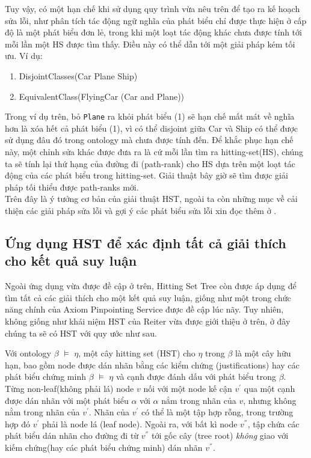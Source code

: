 		\hspace*{.05\textwidth} Tuy vậy, có một hạn chế khi sử dụng quy trình vừa nêu trên để tạo ra kế hoạch sửa lỗi, như phân tích tác động ngữ nghĩa của phát biểu chỉ được thực hiện ở cấp độ là một phát biểu đơn lẻ, trong khi một loạt tác động khác chưa được tính tới mỗi lần một HS được tìm thấy. Điều này có thể dẫn tới một giải pháp kém tối ưu. Ví dụ:
		\begin{enumerate}
			\item	DisjointClasses(Car Plane Ship)
			\item	EquivalentClass(FlyingCar (Car and Plane))			
		\end{enumerate}
		Trong ví dụ trên, bỏ \texttt{Plane} ra khỏi phát biểu (1) sẽ hạn chế mất mát về nghĩa hơn là xóa hết cả phát biểu (1), vì có thể disjoint giữa Car và Ship có thể được sử dụng đâu đó trong ontology mà chưa được tính đến.
		\hspace*{.05\textwidth} Để khắc phục hạn chế này, một chỉnh sửa khác được đưa ra là cứ mỗi lần tìm ra hitting-set(HS), chúng ta sẽ tính lại thứ hạng của đường đi (path-rank) cho HS dựa trên một loạt tác động của các phát biểu trong hitting-set. Giải thuật bây giờ sẽ tìm được giải pháp tối thiểu được path-ranks mới.
		\\
		Trên đây là ý tưởng cơ bản của giải thuật HST, ngoài ta còn những mục về cải thiện các giải pháp sửa lỗi và gợi ý các phát biểu sửa lỗi xin đọc thêm ở \cite{repair}.
		
		\subsection{Ứng dụng HST để xác định tất cả giải thích cho kết quả suy luận\cite{matt_horridge}}
		Ngoài ứng dụng vừa được đề cập ở trên, Hitting Set Tree còn được áp dụng để tìm tất cả các giải thích cho một kết quả suy luận, giống như một trong chức năng chính của Axiom Pinpointing Service được đề cập lúc nãy. Tuy nhiên, không giống như khái niệm HST của Reiter vừa được giới thiệu ở trên, ở đây chúng ta sẽ có HST với quy ước như sau.
		
		\hspace*{.05\textwidth} Với ontology $\beta$ $\models$ $\eta$, một cây hitting set (HST) cho $\eta$ trong $\beta$ là một cây hữu hạn, bao gồm node được dán nhãn bằng các kiểm chứng (justifications) hay các phát biểu chứng minh $\beta$ $\models$ $\eta$ và cạnh được đánh dấu với phát biểu trong $\beta$. Từng non-leaf(không phải lá) node $v$ nối với một node kế cận $v^{'}$ qua một cạnh được dán nhãn với một phát biểu $\alpha$ với $\alpha$ nẳm trong nhãn của $v$, nhưng không nằm trong nhãn của $v^{'}$. Nhãn của $v^{'}$ có thể là một tập hợp rỗng, trong trường hợp đó $v^{'}$ phải là node lá (leaf node). Ngoài ra, với bất kì node $v^{''}$, tập chứa các phát biểu dán nhãn cho đường đi từ $v^{''}$ tới gốc cây (tree root) \textit{không} giao với kiếm chứng(hay các phát biểu chứng minh) dán nhãn $v^{''}$.
		
